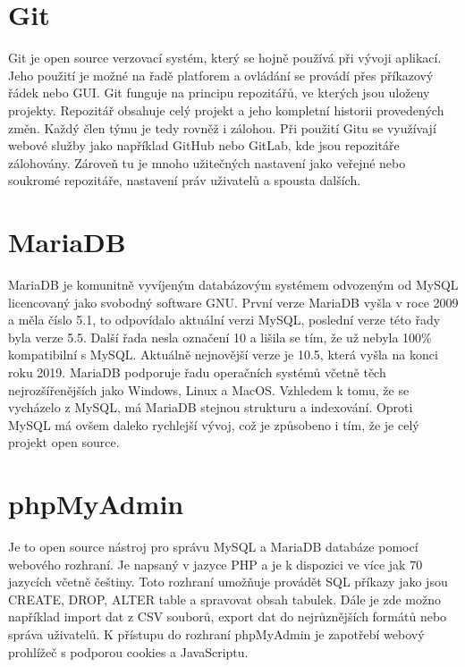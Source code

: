 \section{Git}

Git je open source verzovací systém, který se hojně používá při vývoji
aplikací. Jeho použití je možné na řadě platforem a ovládání
se provádí přes příkazový řádek nebo GUI. Git funguje na principu
repozitářů, ve kterých jsou uloženy projekty. Repozitář obsahuje celý
projekt a jeho kompletní historii provedených změn. Každý člen týmu je
tedy rovněž i zálohou. Při použití Gitu se využívají webové služby
jako například GitHub nebo GitLab, kde jsou repozitáře
zálohovány. Zároveň tu je mnoho užitečných nastavení jako veřejné nebo
soukromé repozitáře, nastavení práv uživatelů a spousta dalších. \cite{git}

\newpage

\section{MariaDB}

MariaDB je komunitně vyvíjeným databázovým systémem odvozeným od MySQL
licencovaný jako svobodný software GNU. První verze MariaDB vyšla v
roce 2009 a měla číslo 5.1, to odpovídalo aktuální verzi MySQL,
poslední verze této řady byla verze 5.5. Další řada nesla označení 10
a lišila se tím, že už nebyla 100\% kompatibilní s MySQL. Aktuálně
nejnovější verze je 10.5, která vyšla na konci roku 2019. MariaDB
podporuje řadu operačních systémů včetně těch nejrozšířenějších jako
Windows, Linux a MacOS. Vzhledem k tomu, že se vycházelo z MySQL, má
MariaDB stejnou strukturu a indexování. Oproti MySQL má ovšem daleko
rychlejší vývoj, což je způsobeno i tím, že je celý projekt open
source. \cite{mariadb}

\section{phpMyAdmin}

Je to open source nástroj pro správu MySQL a MariaDB databáze pomocí
webového rozhraní. Je napsaný v jazyce PHP a je k dispozici ve více jak 70
jazycích včetně češtiny. Toto rozhraní umožňuje provádět SQL příkazy
jako jsou CREATE, DROP, ALTER table a spravovat obsah tabulek. Dále je
zde možno například import dat z CSV souborů, export dat do
nejrůznějších formátů nebo správa uživatelů. K přístupu do rozhraní
phpMyAdmin je zapotřebí webový prohlížeč s podporou cookies a
JavaScriptu. \cite{phpmyadmin} \cite{phpmyadmin-2}

